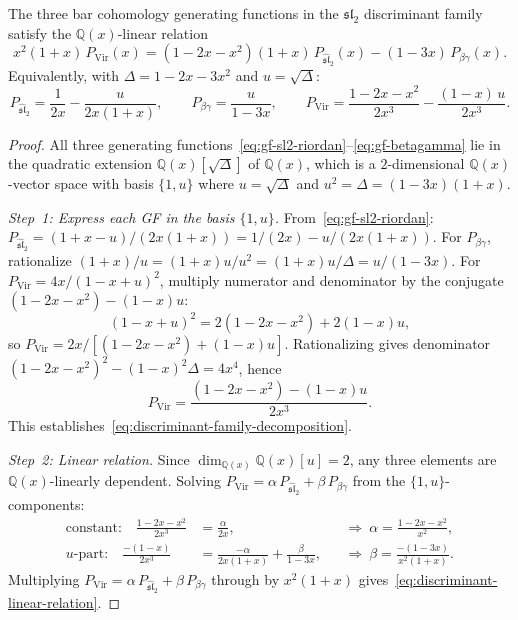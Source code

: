 \begin{theorem}
\label{thm:discriminant-linear-dependence}
The three bar cohomology generating functions in the
$\mathfrak{sl}_2$ discriminant family satisfy the
$\mathbb{Q}(x)$-linear relation
\begin{equation}\label{eq:discriminant-linear-relation}
x^2(1{+}x)\, P_{\mathrm{Vir}}(x)
= (1{-}2x{-}x^2)(1{+}x)\, P_{\widehat{\mathfrak{sl}}_2}(x)
  - (1{-}3x)\, P_{\beta\gamma}(x).
\end{equation}
Equivalently, with $\Delta = 1 - 2x - 3x^2$ and $u = \sqrt{\Delta}$:
\begin{equation}\label{eq:discriminant-family-decomposition}
P_{\widehat{\mathfrak{sl}}_2} = \frac{1}{2x} - \frac{u}{2x(1{+}x)},
\qquad
P_{\beta\gamma} = \frac{u}{1{-}3x},
\qquad
P_{\mathrm{Vir}} = \frac{1{-}2x{-}x^2}{2x^3} - \frac{(1{-}x)\,u}{2x^3}.
\end{equation}
\end{theorem}

\begin{proof}
All three generating functions~\eqref{eq:gf-sl2-riordan}--\eqref{eq:gf-betagamma}
lie in the quadratic extension
$\mathbb{Q}(x)[\sqrt{\Delta}]$ of $\mathbb{Q}(x)$,
which is a $2$-dimensional $\mathbb{Q}(x)$-vector space with basis
$\{1, u\}$ where $u = \sqrt{\Delta}$ and $u^2 = \Delta = (1{-}3x)(1{+}x)$.

\emph{Step~1: Express each GF in the basis $\{1, u\}$.}
From~\eqref{eq:gf-sl2-riordan}:
$P_{\widehat{\mathfrak{sl}}_2} = (1{+}x{-}u)/(2x(1{+}x)) = 1/(2x) - u/(2x(1{+}x))$.
For $P_{\beta\gamma}$, rationalize $(1{+}x)/u = (1{+}x)u/u^2 = (1{+}x)u/\Delta = u/(1{-}3x)$.
For $P_{\mathrm{Vir}} = 4x/(1{-}x{+}u)^2$,
multiply numerator and denominator by the conjugate
$(1{-}2x{-}x^2) - (1{-}x)u$:
\[
(1{-}x{+}u)^2 = 2(1{-}2x{-}x^2) + 2(1{-}x)u,
\]
so $P_{\mathrm{Vir}} = 2x/[(1{-}2x{-}x^2)+(1{-}x)u]$.
Rationalizing gives denominator
$(1{-}2x{-}x^2)^2 - (1{-}x)^2\Delta = 4x^4$, hence
\[
P_{\mathrm{Vir}} = \frac{(1{-}2x{-}x^2)-(1{-}x)u}{2x^3}.
\]
This establishes~\eqref{eq:discriminant-family-decomposition}.

\emph{Step~2: Linear relation.}
Since $\dim_{\mathbb{Q}(x)} \mathbb{Q}(x)[u] = 2$,
any three elements are $\mathbb{Q}(x)$-linearly dependent.
Solving $P_{\mathrm{Vir}} = \alpha\, P_{\widehat{\mathfrak{sl}}_2} + \beta\, P_{\beta\gamma}$
from the $\{1,u\}$-components:
\begin{align*}
\text{constant:} \quad
  \frac{1{-}2x{-}x^2}{2x^3} &= \frac{\alpha}{2x},
  &&\Rightarrow\ \alpha = \frac{1{-}2x{-}x^2}{x^2}, \\
\text{$u$-part:} \quad
  \frac{-(1{-}x)}{2x^3} &= \frac{-\alpha}{2x(1{+}x)} + \frac{\beta}{1{-}3x},
  &&\Rightarrow\ \beta = \frac{-(1{-}3x)}{x^2(1{+}x)}.
\end{align*}
Multiplying $P_{\mathrm{Vir}} = \alpha\, P_{\widehat{\mathfrak{sl}}_2} + \beta\, P_{\beta\gamma}$
through by $x^2(1{+}x)$ gives~\eqref{eq:discriminant-linear-relation}.
\end{proof}

